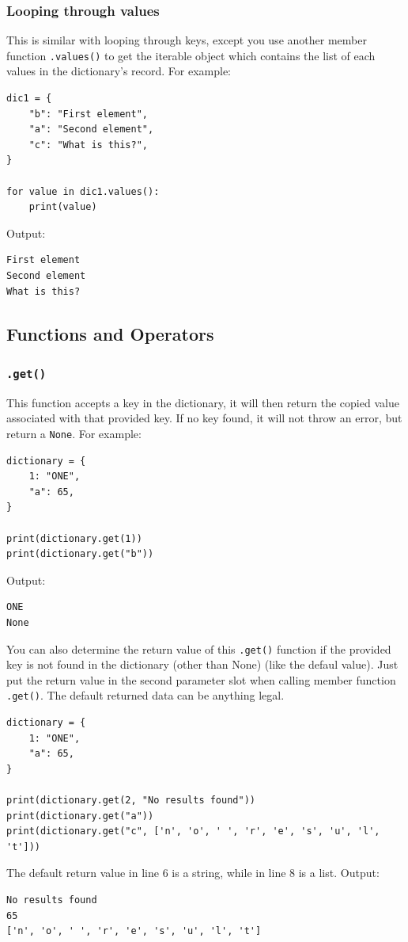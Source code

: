 \documentclass[12pt]{book}
\begin{document}
\subsubsection{Looping through values}
\label{sec:org55b95b1}
This is similar with looping through keys, except you use another member function \texttt{.values()} to get the iterable object which contains the list of each values in the dictionary's record. For example:
\begin{verbatim}
dic1 = {
    "b": "First element",
    "a": "Second element",
    "c": "What is this?",
}

for value in dic1.values():
    print(value)
\end{verbatim}
Output:
\begin{verbatim}
First element
Second element
What is this?
\end{verbatim}

\subsection{Functions and Operators}
\label{sec:orgc457e65}
\subsubsection{\texttt{.get()}}
\label{sec:org86a01b9}
This function accepts a key in the dictionary, it  will then return the copied value associated with that provided key. If no key found, it will not throw an error, but return a \texttt{None}. For example:
\begin{verbatim}
dictionary = {
    1: "ONE",
    "a": 65,
}

print(dictionary.get(1))
print(dictionary.get("b"))
\end{verbatim}
Output:
\begin{verbatim}
ONE
None
\end{verbatim}

You can also determine the return value of this \texttt{.get()} function if the provided key is not found in the dictionary (other than None) (like the defaul value). Just put the return value in the second parameter slot when calling member function \texttt{.get()}. The default returned data can be anything legal.
\begin{verbatim}
dictionary = {
    1: "ONE",
    "a": 65,
}

print(dictionary.get(2, "No results found"))
print(dictionary.get("a"))
print(dictionary.get("c", ['n', 'o', ' ', 'r', 'e', 's', 'u', 'l', 't']))
\end{verbatim}
The default return value in line 6 is a string, while in line 8 is a list. Output:
\begin{verbatim}
No results found
65
['n', 'o', ' ', 'r', 'e', 's', 'u', 'l', 't']
\end{verbatim}
\end{document}

